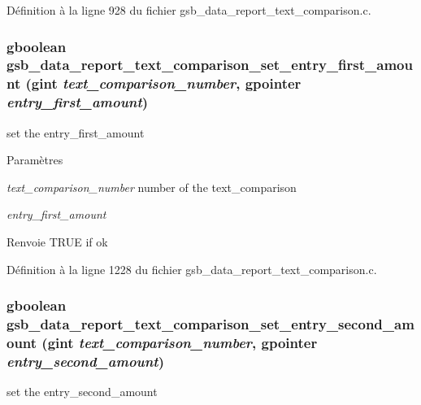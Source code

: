 Définition à la ligne 928 du fichier gsb\_\-data\_\-report\_\-text\_\-comparison.c.

\subsubsection[{gsb\_\-data\_\-report\_\-text\_\-comparison\_\-set\_\-entry\_\-first\_\-amount}]{\setlength{\rightskip}{0pt plus 5cm}gboolean gsb\_\-data\_\-report\_\-text\_\-comparison\_\-set\_\-entry\_\-first\_\-amount (gint {\em text\_\-comparison\_\-number}, \/  gpointer {\em entry\_\-first\_\-amount})}\label{gsb__data__report__text__comparison_8c_af4b8d9bf4d4013e6e50587842f7e507d}
set the entry\_\-first\_\-amount


\begin{DoxyParams}{Paramètres}
\item[{\em text\_\-comparison\_\-number}]number of the text\_\-comparison \item[{\em entry\_\-first\_\-amount}]\end{DoxyParams}
\begin{DoxyReturn}{Renvoie}
TRUE if ok 
\end{DoxyReturn}


Définition à la ligne 1228 du fichier gsb\_\-data\_\-report\_\-text\_\-comparison.c.

\subsubsection[{gsb\_\-data\_\-report\_\-text\_\-comparison\_\-set\_\-entry\_\-second\_\-amount}]{\setlength{\rightskip}{0pt plus 5cm}gboolean gsb\_\-data\_\-report\_\-text\_\-comparison\_\-set\_\-entry\_\-second\_\-amount (gint {\em text\_\-comparison\_\-number}, \/  gpointer {\em entry\_\-second\_\-amount})}\label{gsb__data__report__text__comparison_8c_a07b8ad9d6e19ec0ed1ab6b0e13ca3aff}
set the entry\_\-second\_\-amount


